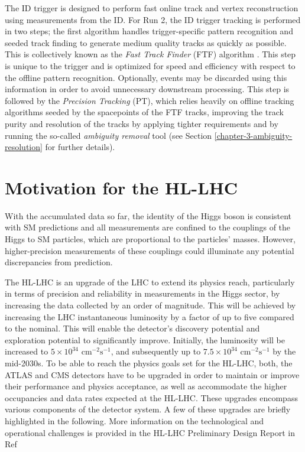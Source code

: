 The ID trigger is designed to perform fast online track and vertex reconstruction using measurements from the ID. For Run 2, the ID trigger tracking is performed in two steps; the first algorithm handles trigger-specific pattern recognition and seeded track finding to generate medium quality tracks as quickly as possible. This is collectively known as the \textit{Fast Track Finder} (FTF) algorithm \cite{Penc:2104217, Grandi:2624768}. This step is unique to the trigger and is optimized for speed and efficiency with respect to the offline pattern recognition. Optionally, events may be discarded using this information in order to avoid unnecessary downstream processing. This step is followed by the \textit{Precision Tracking} (PT), which relies heavily on offline tracking algorithms \cite{T_Cornelissen_2008} seeded by the spacepoints of the FTF tracks, improving the track purity and resolution of the tracks by applying tighter requirements and by running the so-called \textit{ambiguity removal} tool (see Section \ref{chapter-3-ambiguity-resolution} for further details). 



\section{Motivation for the HL-LHC}
\label{hi-lumi}


With the accumulated data so far, the identity of the Higgs boson is consistent with SM predictions and all measurements are confined to the couplings of the Higgs to SM particles, which are proportional to the particles’ masses. However, higher-precision measurements of these couplings could illuminate any potential discrepancies from prediction.

The HL-LHC is an upgrade of the \ac{LHC} to extend its physics reach, particularly in terms of precision and reliability in measurements in the Higgs sector, by increasing the data collected by an order of magnitude. This will be achieved by increasing the LHC instantaneous luminosity by a factor of up to five compared to the nominal. This will enable the detector's discovery potential and exploration potential to significantly improve. Initially, the luminosity will be increased to $5 \times 10^{34}  \text{ cm}^{−2}\text{s}^{−1}$, and subsequently up to $7.5 \times 10^{34}  \text{ cm}^{−2}\text{s}^{−1}$ by the mid-2030s. To be able to reach the physics goals set for the HL-LHC, both, the ATLAS and CMS detectors have to be upgraded in order to maintain or improve their performance and physics acceptance, as well as accommodate the higher occupancies and data rates expected at the HL-LHC. These upgrades encompass various components of the detector system. A few of these upgrades are briefly highlighted in the following. More information on the technological and operational challenges is provided in the HL-LHC Preliminary Design Report in Ref \cite{Apollinari:2116337}

